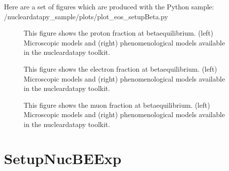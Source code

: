 \documentclass[letterpaper,10pt,english]{sphinxmanual}
\begin{document}
\sphinxAtStartPar
Here are a set of figures which are produced with the Python sample: /nucleardatapy\_sample/plots/plot\_eos\_setupBeta.py

\begin{figure}[htbp]
\centering
\capstart

\noindent{}
\caption{This figure shows the proton fraction at beta\sphinxhyphen{}equilibrium. (left) Microscopic models and (right) phenomenological models available in the nucleardatapy toolkit.}\label{\detokenize{source/api/setup_eos_beta:id1}}\end{figure}

\begin{figure}[htbp]
\centering
\capstart

\noindent{}
\caption{This figure shows the electron fraction at beta\sphinxhyphen{}equilibrium. (left) Microscopic models and (right) phenomenological models available in the nucleardatapy toolkit.}\label{\detokenize{source/api/setup_eos_beta:id2}}\end{figure}

\begin{figure}[htbp]
\centering
\capstart

\noindent{}
\caption{This figure shows the muon fraction at beta\sphinxhyphen{}equilibrium. (left) Microscopic models and (right) phenomenological models available in the nucleardatapy toolkit.}\label{\detokenize{source/api/setup_eos_beta:id3}}\end{figure}

\sphinxstepscope


\section{SetupNucBEExp}
\label{\detokenize{source/api/setup_nuc_be_exp:setupnucbeexp}}\label{\detokenize{source/api/setup_nuc_be_exp::doc}}\label{\detokenize{source/api/setup_nuc_be_exp:module-nucleardatapy.nuc.setup_be_exp}}
\end{document}
